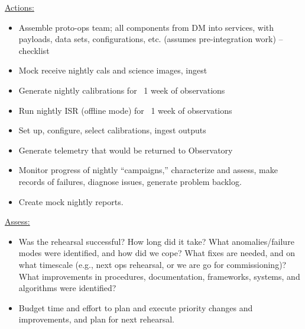 \underline{Actions:}

\begin{itemize}
\item Assemble proto-ops team; all components from DM into services, with payloads, data sets, configurations, etc. (assumes pre-integration work) -- checklist
\item Mock receive nightly cals and science images, ingest
\item Generate nightly calibrations for ~1 week of observations
\item Run nightly ISR (offline mode) for ~1 week of observations
\item Set up, configure, select calibrations, ingest outputs
\item Generate telemetry that would be returned to Observatory
\item Monitor progress of nightly “campaigns,” characterize and assess, make records of failures, diagnose issues, generate problem backlog.
\item Create mock nightly reports.
\end{itemize}

\underline{Assess:}

\begin{itemize}
\item Was the rehearsal successful? How long did it take? What anomalies/failure modes were identified, and how did we cope? What fixes are needed, and on what timescale (e.g., next ops rehearsal, or we are go for commissioning)? What improvements in procedures, documentation, frameworks, systems, and algorithms were identified?
\item Budget time and effort to plan and execute priority changes and improvements, and plan for next rehearsal.
\end{itemize}


